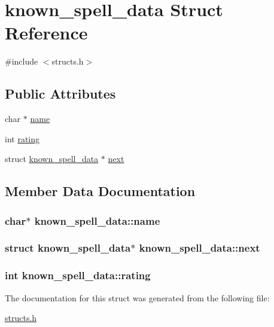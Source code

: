 \hypertarget{structknown__spell__data}{\section{known\-\_\-spell\-\_\-data Struct Reference}
\label{structknown__spell__data}
}


{\ttfamily \#include $<$structs.\-h$>$}

\subsection*{Public Attributes}
\begin{DoxyCompactItemize}
\item 
char $\ast$ \hyperlink{structknown__spell__data_aa78f9f7af67470ef5b565248b691784e}{name}
\item 
int \hyperlink{structknown__spell__data_a8ae3ad2d4386467a83a50b64967a44c5}{rating}
\item 
struct \hyperlink{structknown__spell__data}{known\-\_\-spell\-\_\-data} $\ast$ \hyperlink{structknown__spell__data_aec77da24e3bbece669ea59a24d12517b}{next}
\end{DoxyCompactItemize}


\subsection{Member Data Documentation}
\hypertarget{structknown__spell__data_aa78f9f7af67470ef5b565248b691784e}{
\subsubsection[{name}]{\setlength{\rightskip}{0pt plus 5cm}char$\ast$ known\-\_\-spell\-\_\-data\-::name}}\label{structknown__spell__data_aa78f9f7af67470ef5b565248b691784e}
\hypertarget{structknown__spell__data_aec77da24e3bbece669ea59a24d12517b}{
\subsubsection[{next}]{\setlength{\rightskip}{0pt plus 5cm}struct {\bf known\-\_\-spell\-\_\-data}$\ast$ known\-\_\-spell\-\_\-data\-::next}}\label{structknown__spell__data_aec77da24e3bbece669ea59a24d12517b}
\hypertarget{structknown__spell__data_a8ae3ad2d4386467a83a50b64967a44c5}{
\subsubsection[{rating}]{\setlength{\rightskip}{0pt plus 5cm}int known\-\_\-spell\-\_\-data\-::rating}}\label{structknown__spell__data_a8ae3ad2d4386467a83a50b64967a44c5}


The documentation for this struct was generated from the following file\-:\begin{DoxyCompactItemize}
\item 
\hyperlink{structs_8h}{structs.\-h}\end{DoxyCompactItemize}

